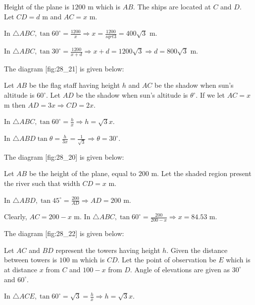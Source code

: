   Height of the plane is $1200$ m which is $AB$. The ships are located at $C$ and $D$. Let $CD = d$
  m and $AC = x$ m.

  In $\triangle ABC, \tan60^\circ = \frac{1200}{x} \Rightarrow x = \frac{1200}{sqrt{3}} = 400\sqrt{3}$ m.

  In $\triangle ABC, \tan30^\circ = \frac{1200}{x + d} \Rightarrow x + d = 1200\sqrt{3} \Rightarrow d = 800\sqrt{3}$ m.

\item The diagram [fig:28_21] is given below:

  \startplacefigure[reference=fig:28_21]
    \externalfigure[28_21.pdf]
  \stopplacefigure

  Let $AB$ be the flag staff having height $h$ and $AC$ be the shadow when sun's altitude is
  $60^\circ$. Let $AD$ be the shadow when sun's altitude is $\theta^\circ$. If we let $AC = x$ m then
  $AD = 3x \Rightarrow CD = 2x$.

  In $\triangle ABC, \tan60^\circ = \frac{h}{x} \Rightarrow h = \sqrt{3}x$.

  In $\triangle ABD \tan\theta = \frac{h}{3x} = \frac{1}{\sqrt{3}}\Rightarrow \theta = 30^\circ$.

\item The diagram [fig:28_20] is given below:

  \startplacefigure[reference=fig:28_20]
    \externalfigure[28_20.pdf]
  \stopplacefigure

  Let $AB$ be the height of the plane, equal to $200$ m. Let the shaded region present the river such that width
  $CD = x$ m.

  In $\triangle ABD, \tan45^\circ = \frac{200}{AD} \Rightarrow AD = 200$ m.

  Clearly, $AC = 200 - x$ m. In $\triangle ABC, \tan60^\circ = \frac{200}{200 - x} \Rightarrow x = 84.53$ m.

\item The diagram [fig:28_22] is given below:

  \startplacefigure[reference=fig:28_22]
    \externalfigure[28_22.pdf]
  \stopplacefigure

  Let $AC$ and $BD$ represent the towers having height $h$. Given the distance between towers is $100$ m
  which is $CD$. Let the point of observation be $E$ which is at distance $x$ from $C$ and $100 - x$
  from $D$. Angle of elevations are given as $30^\circ$ and $60^\circ$.

  In $\triangle ACE, \tan60^\circ = \sqrt{3} = \frac{h}{x}\Rightarrow h = \sqrt{3}x$.

